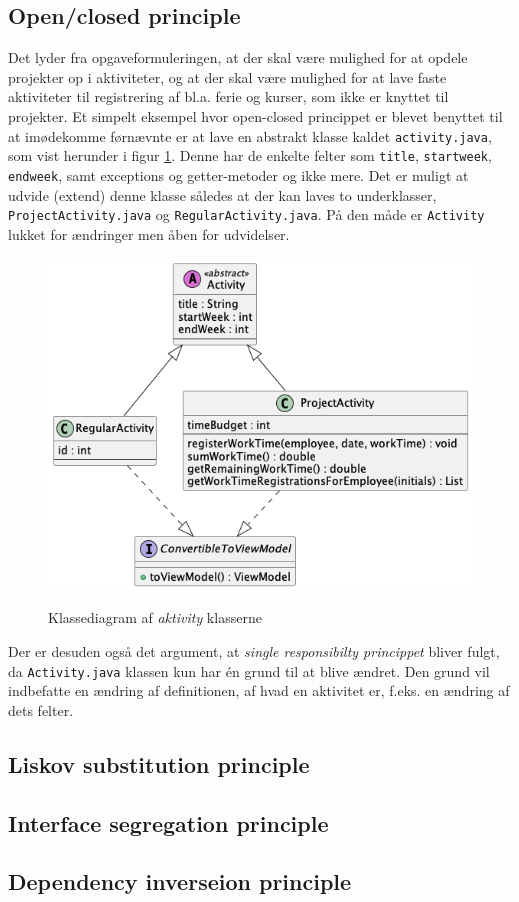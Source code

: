 \subsection{Open/closed principle}
Det lyder fra opgaveformuleringen, at der skal være mulighed for at opdele projekter op i aktiviteter, og at der skal være mulighed for at lave faste aktiviteter til registrering af bl.a. ferie og kurser, som ikke er knyttet til projekter. Et simpelt eksempel hvor open-closed princippet er blevet benyttet til at imødekomme førnævnte er at lave en abstrakt klasse kaldet \texttt{activity.java}, som vist herunder i figur \ref{fig:class_open_closed_example}. Denne har de enkelte felter som \texttt{title}, \texttt{startweek}, \texttt{endweek}, samt exceptions og getter-metoder og ikke mere. Det er muligt at udvide (extend) denne klasse således at der kan laves to underklasser, \texttt{ProjectActivity.java} og \texttt{RegularActivity.java}. På den måde er \texttt{Activity} lukket for ændringer men åben for udvidelser. 
\begin{figure}[H]
    \centering
    \caption{Klassediagram af \textit{aktivity} klasserne}
    \includegraphics[width = 15cm, keepaspectratio]{TaskFusion/out/assets/diagrams/class_open_closed_example/class_open_closed_example.png}
    \label{fig:class_open_closed_example}
\end{figure}

Der er desuden også det argument, at \textit{single responsibilty princippet} bliver fulgt, da \texttt{Activity.java} klassen kun har én grund til at blive ændret. Den grund vil indbefatte en ændring af definitionen, af hvad en aktivitet er, f.eks. en ændring af dets felter.


\subsection{Liskov substitution principle}



\subsection{Interface segregation principle}



\subsection{Dependency inverseion principle}

